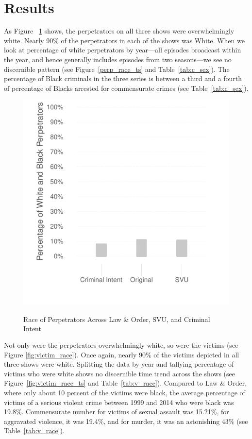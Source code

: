 \documentclass[12pt, letterpaper]{article}
\begin{document}
\section*{Results}

As Figure ~\ref{fig:perp_race} shows, the perpetrators on all three shows were overwhelmingly white. Nearly 90\% of the perpetrators in each of the shows was White. When we look at percentage of white perpetrators by year---all episodes broadcast within the year, and hence generally includes episodes from two seasons---we see no discernible pattern (see Figure~\ref{perp_race_ts} and Table~\ref{tab:c_sex}). The percentage of Black criminals in the three series is between a third and a fourth of percentage of Blacks arrested for commensurate crimes (see Table~\ref{tab:c_sex}). 

\begin{figure}[htbp]
\centering
\caption{Race of Perpetrators Across Law \& Order, SVU, and Criminal Intent}
\includegraphics[scale=1]{../figs/all_criminals_by_race.pdf}
\label{fig:perp_race}
\end{figure}

Not only were the perpetrators overwhelmingly white, so were the victims (see Figure \ref{fig:victim_race}). Once again, nearly 90\% of the victims depicted in all three shows were white. Splitting the data by year and tallying percentage of victims who were white shows no discernible time trend across the shows (see Figure~\ref{fig:victim_race_ts} and Table~\ref{tab:v_race}). Compared to Law \& Order, where only about 10 percent of the victims were black, the average percentage of victims of a serious violent crime between 1999 and 2014 who were black was 19.8\%. Commensurate number for victims of sexual assault was 15.21\%, for aggravated violence, it was 19.4\%, and for murder, it was an astonishing 43\% (see Table~\ref{tab:v_race}).
\end{document}
